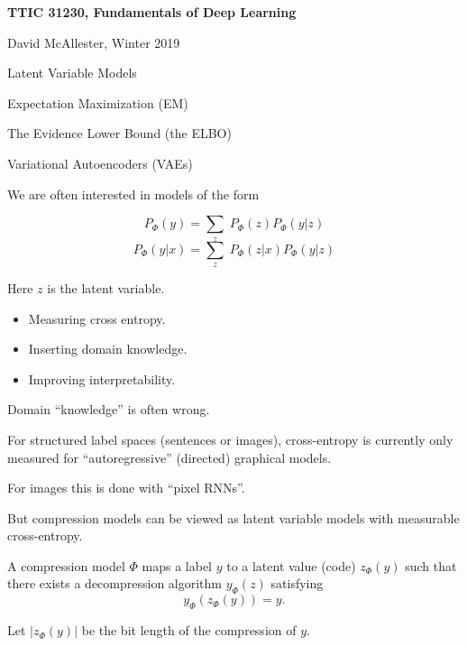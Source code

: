  





{\Huge

  \centerline{\bf TTIC 31230, Fundamentals of Deep Learning}
  \bigskip
  \centerline{David McAllester, Winter 2019}
  \vfill
  \centerline{Latent Variable Models}
  \vfill
  \centerline{Expectation Maximization (EM)}
  \vfill
  \centerline{The Evidence Lower Bound (the ELBO)}
  \vfill
  \centerline{Variational Autoencoders (VAEs)}
  \vfill
  \vfill


We are often interested in models of the form

\vfill
{\color{red} $$P_\Phi(y) = \sum_z\;P_\Phi(z)P_\Phi(y|z)$$}
{\color{red} $$P_\Phi(y|x) = \sum_z\;P_\Phi(z|x)P_\Phi(y|z)$$}

\vfill
Here {\color{red} $z$} is the latent variable.


\begin{itemize}
\item Measuring cross entropy.

\vfill
\item Inserting domain knowledge.

\vfill
\item Improving interpretability.
\end{itemize}


\centerline{Domain ``knowledge'' is often wrong.}


For structured label spaces (sentences or images), cross-entropy is currently only measured for ``autoregressive'' (directed) graphical models.

\vfill
For images this is done with ``pixel RNNs''.

\vfill
But compression models can be viewed as latent variable models with measurable cross-entropy.


A compression model $\Phi$ maps a label $y$ to a latent value (code) $z_\Phi(y)$ such that
there exists a decompression algorithm $y_\Phi(z)$ satisfying
{\color{red} $$y_\Phi(z_\Phi(y)) = y.$$}

\vfill
Let {\color{red} $|z_\Phi(y)|$} be the bit length of the compression of $y$.

}
